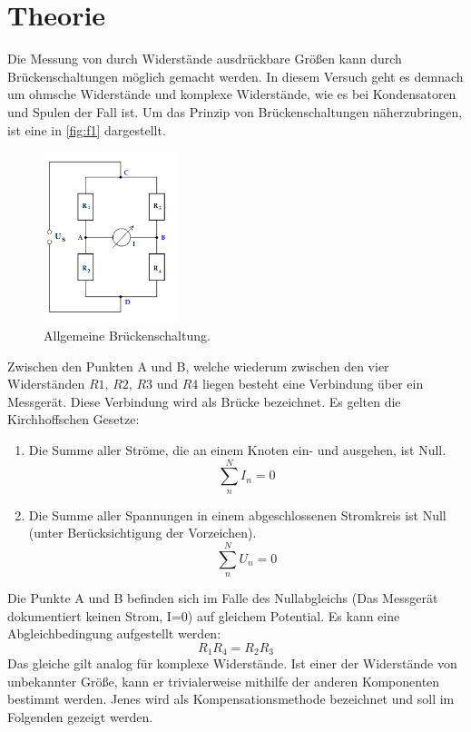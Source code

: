 \section{Theorie}
\label{sec:Theorie}

Die Messung von durch Widerstände ausdrückbare Größen kann durch Brückenschaltungen 
möglich gemacht werden. In diesem Versuch geht es demnach um ohmsche Widerstände
und komplexe Widerstände, wie es bei Kondensatoren und Spulen der Fall ist.
Um das Prinzip von Brückenschaltungen näherzubringen, ist eine in \autoref{fig:f1}
dargestellt.
\begin{figure}[H]
    \centering
        \centering
        \includegraphics[width=0.35\textwidth]{Bilder/Brueckenschaltung.png}
        \caption{Allgemeine Brückenschaltung. \cite{anleitung}}
    \hfill
    \label{fig:f1}
\end{figure}
\noindent Zwischen den Punkten A und B, welche wiederum zwischen den vier Widerständen 
$R1$, $R2$, $R3$ und $R4$ liegen besteht eine Verbindung über ein Messgerät. 
Diese Verbindung wird als Brücke bezeichnet. Es gelten die Kirchhoffschen Gesetze:
\begin{enumerate}
    \item Die Summe aller Ströme, die an einem Knoten ein- und ausgehen, ist Null.
    \begin{equation}
        \sum\limits_{n}^N I_n = 0
    \end{equation}
    \item Die Summe aller Spannungen in einem abgeschlossenen Stromkreis ist Null 
    (unter Berücksichtigung der Vorzeichen).
    \begin{equation}
        \sum\limits_{n}^N U_n = 0
    \end{equation}
\end{enumerate}
\par\vspace{0.5em}
\noindent Die Punkte A und B befinden sich im Falle des Nullabgleichs (Das 
Messgerät dokumentiert keinen Strom, I=0) auf gleichem Potential.
Es kann eine Abgleichbedingung aufgestellt werden:
\begin{equation}
    R_1 R_4 = R_2 R_3
\end{equation}
Das gleiche gilt analog für komplexe Widerstände. Ist einer der Widerstände 
von unbekannter Größe, kann er trivialerweise mithilfe der anderen Komponenten 
bestimmt werden. Jenes wird als Kompensationsmethode bezeichnet und soll im 
Folgenden gezeigt werden.